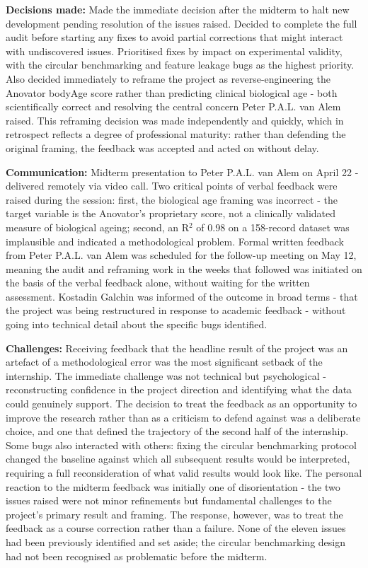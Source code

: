 \documentclass[11pt,a4paper]{article}
\begin{document}
\textbf{Decisions made:} Made the immediate decision after the midterm to halt new development pending resolution of the issues raised. Decided to complete the full audit before starting any fixes to avoid partial corrections that might interact with undiscovered issues. Prioritised fixes by impact on experimental validity, with the circular benchmarking and feature leakage bugs as the highest priority. Also decided immediately to reframe the project as reverse-engineering the Anovator bodyAge score rather than predicting clinical biological age  -  both scientifically correct and resolving the central concern Peter P.A.L. van Alem raised. This reframing decision was made independently and quickly, which in retrospect reflects a degree of professional maturity: rather than defending the original framing, the feedback was accepted and acted on without delay.

\textbf{Communication:} Midterm presentation to Peter P.A.L. van Alem on April 22  -  delivered remotely via video call. Two critical points of verbal feedback were raised during the session: first, the biological age framing was incorrect  -  the target variable is the Anovator's proprietary score, not a clinically validated measure of biological ageing; second, an R$^{2}$ of 0.98 on a 158-record dataset was implausible and indicated a methodological problem. Formal written feedback from Peter P.A.L. van Alem was scheduled for the follow-up meeting on May 12, meaning the audit and reframing work in the weeks that followed was initiated on the basis of the verbal feedback alone, without waiting for the written assessment. Kostadin Galchin was informed of the outcome in broad terms  -  that the project was being restructured in response to academic feedback  -  without going into technical detail about the specific bugs identified.

\textbf{Challenges:} Receiving feedback that the headline result of the project was an artefact of a methodological error was the most significant setback of the internship. The immediate challenge was not technical but psychological  -  reconstructing confidence in the project direction and identifying what the data could genuinely support. The decision to treat the feedback as an opportunity to improve the research rather than as a criticism to defend against was a deliberate choice, and one that defined the trajectory of the second half of the internship. Some bugs also interacted with others: fixing the circular benchmarking protocol changed the baseline against which all subsequent results would be interpreted, requiring a full reconsideration of what valid results would look like. The personal reaction to the midterm feedback was initially one of disorientation  -  the two issues raised were not minor refinements but fundamental challenges to the project's primary result and framing. The response, however, was to treat the feedback as a course correction rather than a failure. None of the eleven issues had been previously identified and set aside; the circular benchmarking design had not been recognised as problematic before the midterm.
\end{document}
